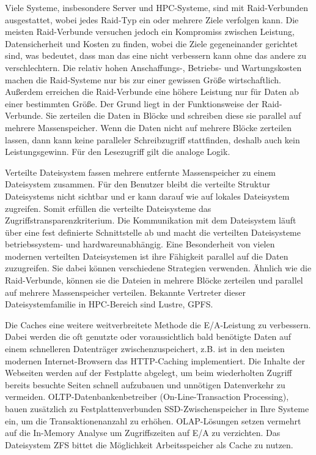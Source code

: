 Viele Systeme, insbesondere Server und HPC-Systeme, sind mit Raid-Verbunden ausgestattet, wobei jedes Raid-Typ ein oder mehrere Ziele verfolgen kann. 
Die meisten Raid-Verbunde versuchen jedoch ein Kompromiss zwischen Leistung, Datensicherheit und Kosten zu finden, wobei die Ziele gegeneinander gerichtet sind, was bedeutet, dass man das eine nicht verbessern kann ohne das andere zu verschlechtern. 
Die relativ hohen Anschaffungs-, Betriebs- und Wartungskosten machen die Raid-Systeme nur bis zur einer gewissen Größe wirtschaftlich. 
Außerdem erreichen die Raid-Verbunde eine höhere Leistung nur für Daten ab einer bestimmten Größe. 
Der Grund liegt in der Funktionsweise der Raid-Verbunde. 
Sie zerteilen die Daten in  Blöcke und schreiben diese sie parallel auf mehrere Massenspeicher. 
Wenn die Daten nicht auf mehrere Blöcke zerteilen lassen, dann kann keine paralleler Schreibzugriff stattfinden, deshalb auch kein Leistungsgewinn. 
Für den Lesezugriff gilt die analoge Logik.

Verteilte Dateisystem fassen mehrere entfernte Massenspeicher zu einem Dateisystem zusammen. 
Für den Benutzer bleibt die verteilte Struktur Dateisystems nicht sichtbar und er kann darauf wie auf lokales Dateisystem zugreifen. 
Somit erfüllen die verteilte Dateisysteme das Zugriffstransparenzkriterium. 
Die Kommunikation mit dem Dateisystem läuft über eine fest definierte Schnittstelle ab und macht die verteilten Dateisysteme betriebssystem- und hardwareunabhängig. 
Eine Besonderheit von vielen modernen verteilten Dateisystemen ist ihre Fähigkeit parallel auf die Daten zuzugreifen. 
Sie dabei können verschiedene Strategien verwenden. 
Ähnlich wie die Raid-Verbunde, können sie die Dateien in mehrere Blöcke zerteilen und parallel auf mehrere Massenspeicher verteilen. 
Bekannte Vertreter dieser Dateisystemfamilie in HPC-Bereich sind Lustre, GPFS. 

Die Caches eine weitere weitverbreitete Methode die E/A-Leistung zu verbessern. 
Dabei werden die oft genutzte oder voraussichtlich bald benötigte Daten auf einem schnelleren Datenträger zwischenzuspeichert, z.B. ist in den meisten modernen Internet-Browsern das HTTP-Caching implementiert. 
Die Inhalte der Webseiten werden auf der Festplatte abgelegt, um beim wiederholten Zugriff bereits besuchte Seiten schnell aufzubauen und unnötigen Datenverkehr zu vermeiden. 
OLTP-Datenbankenbetreiber (On-Line-Transaction Processing), bauen zusätzlich zu Festplattenverbunden SSD-Zwischenspeicher in Ihre Systeme ein, um die Transaktionenanzahl zu erhöhen. 
OLAP-Lösungen setzen vermehrt auf die In-Memory Analyse um Zugriffszeiten auf E/A zu verzichten.
Das Dateisystem ZFS bittet die Möglichkeit Arbeitsspeicher als Cache zu nutzen. 

